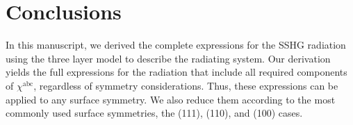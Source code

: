 \documentclass[aps,pra,10pt,amsmath,notitlepage,letterpaper]{revtex4-1}
\begin{document}
\section{Conclusions}

In this manuscript, we derived the complete expressions for the SSHG radiation
using the three layer model to describe the radiating system. Our derivation
yields the full expressions for the radiation that include all required
components of $\chi^{\mathrm{abc}}$, regardless of symmetry considerations.
Thus, these expressions can be applied to any surface symmetry. We also reduce
them according to the most commonly used surface symmetries, the (111), (110),
and (100) cases.






\end{document}
